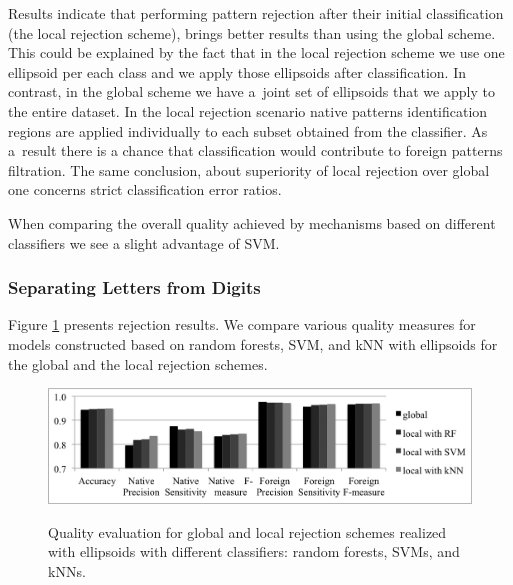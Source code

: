 \documentclass{llncs}
\begin{document}
Results indicate that performing pattern rejection after their initial classification (the local rejection scheme), brings better results than using the global scheme. This could be explained by the fact that in the local rejection scheme we use one ellipsoid per each class and we apply those ellipsoids after classification. In contrast, in the global scheme we have a~joint set of ellipsoids that we apply to the entire dataset. In the local rejection scenario native patterns identification regions are applied individually to each subset obtained from the classifier. As a~result there is a chance that classification would contribute to foreign patterns filtration. The same conclusion, about superiority of local rejection over global one concerns strict classification error ratios.

When comparing the overall quality achieved by mechanisms based on different classifiers we see a slight advantage of SVM. 

\vspace{-12pt}
\subsubsection{Separating Letters from Digits}
Figure \ref{fig:Measures} presents rejection results. We compare various quality measures for models constructed based on random forests, SVM, and kNN with ellipsoids for the global and the local rejection schemes. 

\begin{figure}[!t]
\vspace{-12pt}
  \centering
  \includegraphics[width=\textwidth]{_Figures/Measures_BW.png}\\
  \caption{Quality evaluation for global and local rejection schemes realized with ellipsoids with different classifiers: random forests, SVMs, and kNNs.}
\label{fig:Measures}
\vspace{-12pt}
\end{figure}
\end{document}
